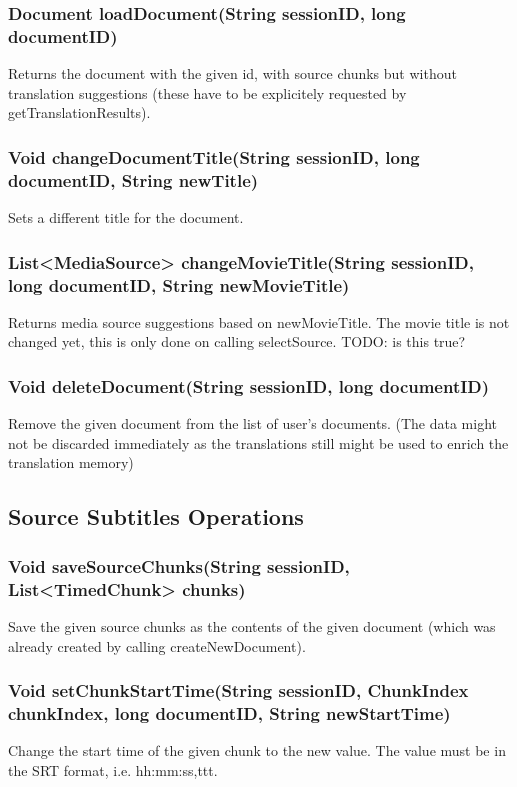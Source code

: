 \subsubsection{Document loadDocument(String sessionID, long documentID)}
Returns the document with the given id, with source chunks but without translation suggestions (these have to be explicitely requested by getTranslationResults).

\subsubsection{Void changeDocumentTitle(String sessionID, long documentID, String newTitle)}
Sets a different title for the document.

\subsubsection{List<MediaSource> changeMovieTitle(String sessionID, long documentID, String newMovieTitle)}
Returns media source suggestions based on newMovieTitle.
The movie title is not changed yet,
this is only done on calling selectSource.
TODO: is this true?     	 
     	
\subsubsection{Void deleteDocument(String sessionID, long documentID)}
Remove the given document from the list of user's documents.
(The data might not be discarded immediately
as the translations still might be used to enrich the translation memory)	 

\subsection{Source Subtitles Operations}

\subsubsection{Void saveSourceChunks(String sessionID, List<TimedChunk> chunks)}
Save the given source chunks as the contents of the given document
(which was already created by calling createNewDocument).

\subsubsection{Void setChunkStartTime(String sessionID, ChunkIndex chunkIndex, long documentID, String newStartTime)}
Change the start time of the given chunk to the new value. The value must be in the SRT format, i.e. hh:mm:ss,ttt.

